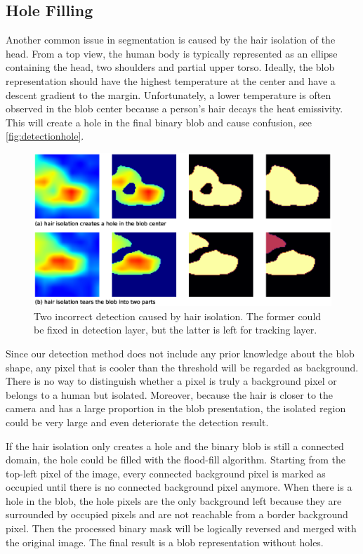 \subsection{Hole Filling}
Another common issue in segmentation is caused by the hair isolation of the head. From a top view, the human body is typically represented as an ellipse containing the head, two shoulders and partial upper torso. Ideally, the blob representation should have the highest temperature at the center and have a descent gradient to the margin. Unfortunately, a lower temperature is often observed in the blob center because a person's hair decays the heat emissivity. This will create a hole in the final binary blob and cause confusion, see \autoref{fig:detectionhole}.
\begin{figure}
  \centering
  \includegraphics[width=\textwidth]{figures/detect_hole.eps}
  \caption{Two incorrect detection caused by hair isolation. The former could be fixed in detection layer, but the latter is left for tracking layer.}\label{fig:detectionhole}
\end{figure}

Since our detection method does not include any prior knowledge about the blob shape, any pixel that is cooler than the threshold will be regarded as background. There is no way to distinguish whether a pixel is truly a background pixel or belongs to a human but isolated. Moreover, because the hair is closer to the camera and has a large proportion in the blob presentation, the isolated region could be very large and even deteriorate the detection result.

If the hair isolation only creates a hole and the binary blob is still a connected domain, the hole could be filled with the flood-fill algorithm. Starting from the top-left pixel of the image, every connected background pixel is marked as occupied until there is no connected background pixel anymore. When there is a hole in the blob, the hole pixels are the only background left because they are surrounded by occupied pixels and are not reachable from a border background pixel. Then the processed binary mask will be logically reversed and merged with the original image. The final result is a blob representation without holes.

